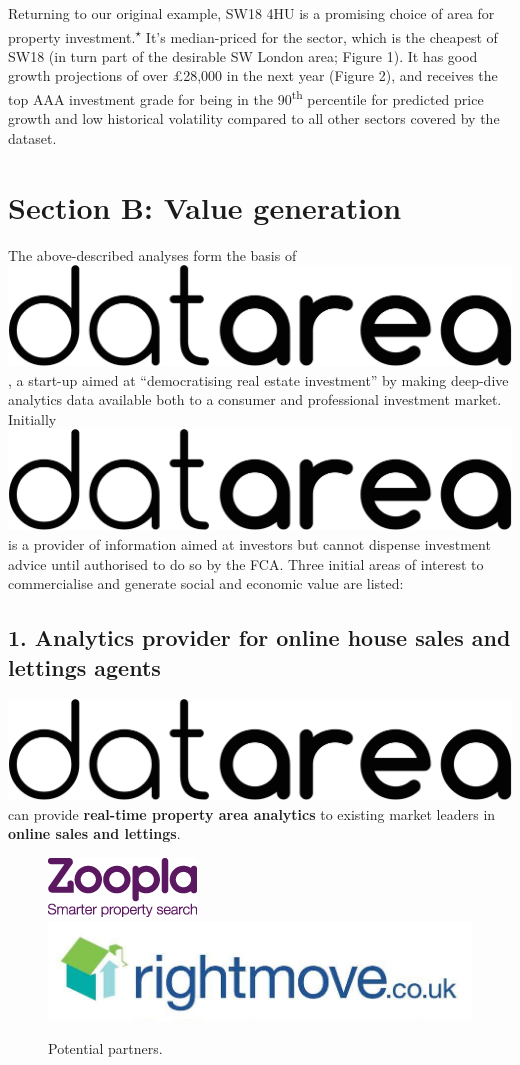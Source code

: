 \documentclass[
10pt, %
a4paper, %
oneside, %
headinclude,footinclude, %
BCOR5mm, %
]{scrartcl}
\newcommand*{\logo}{\includegraphics[scale=.04]{Figures/logotext.png}}
\begin{document}
Returning to our original example, SW18 4HU is a promising choice of
area for property investment.\textsuperscript{$\star$} It's
median-priced for the sector, which is the cheapest of SW18 (in turn
part of the desirable SW London area; Figure 1). It has good growth
projections of over £28,000 in the next year (Figure 2), and receives
the top AAA investment grade for being in the 90\textsuperscript{th}
percentile for predicted price growth and low historical volatility
compared to all other sectors covered by the dataset.

{\let\thefootnote\relax{}}

\clearpage
\section*{Section B: Value generation}

The above-described analyses form the basis of \logo\hspace{.1em}, a
start-up aimed at ``democratising real estate investment'' by making
deep-dive analytics data available both to a consumer and professional
investment market. Initially \logo\hspace{.1em} is a provider of
information aimed at investors but cannot dispense investment advice
until authorised to do so by the FCA. Three initial areas of interest
to commercialise and generate social and economic value are listed:

\subsection*{1. Analytics provider for online house sales and lettings
agents}

\logo\hspace{.1em} can provide {\bf real-time property area analytics} to
existing market leaders in {\bf online sales and lettings}. 

\begin{figure}
\begin{center}
\includegraphics[width=.18\textwidth]{Figures/zoopla.png}
\includegraphics[width=.23\textwidth]{Figures/rightmove.jpg}
\caption*{ Potential partners. }
\end{center}
\end{figure}
\end{document}
